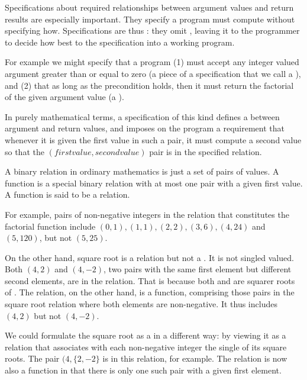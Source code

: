 \documentclass[letterpaper,10pt,english]{sphinxmanual}
\begin{document}
Specifications about required relationships between argument values
and return results are especially important. They specify  a
program must compute without specifying how. Specifications are thus
: they omit , leaving it to the
programmer to decide how best to  the specification into a
working program.

For example we might specify that a program (1) must accept any
integer valued argument greater than or equal to zero (a piece of a
specification that we call a ), and (2) that as long as
the precondition holds, then it must return the factorial of the given
argument value (a ).

In purely mathematical terms, a specification of this kind defines a
 between argument and return values, and imposes on
the program a requirement that whenever it is given the first value in
such a pair, it must compute a second value so that the \((first
value, second value)\) pair is in the specified relation.

A binary relation in ordinary mathematics is just a set of pairs of
values. A function is a special binary relation with at most one pair
with a given first value. A function is said to be a 
relation.

For example, pairs of non-negative integers in the relation that
constitutes the factorial function include \((0,1), (1,1), (2,2),
(3,6), (4,24)\) and \((5,120)\), but not \((5,25)\).

On the other hand, square root is a relation but not a . It
is not singled valued. Both \((4,2)\) and \((4,-2)\), two
pairs with the same first element but different second elements, are
in the relation. That is because both  and  are squarer roots
of .  The  relation, on the other hand, is a
function, comprising those pairs in the square root relation where
both elements are non-negative. It thus includes \((4,2)\) but
not  \((4,-2)\).

We could formulate the square root  as a  in a
different way: by viewing it as a relation that associates with each
non-negative integer the single  of its square roots. The pair
\((4, \{2, -2\}\) is in this relation, for example. The relation is
now also a function in that there is only one such pair with a given
first element.
\end{document}
